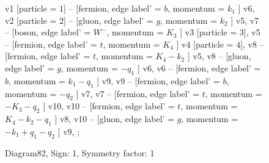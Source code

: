 \documentclass{revtex4}
\begin{document}
\begin{figure}[!htb]
\begin{center}
{    %
v1 [particle = \(1\)] -- [fermion, edge label' = \(b\), momentum = \(k_{1}\) ] v6, 
v2 [particle = \(2\)] -- [gluon, edge label' = \(g\), momentum = \(k_{2}\) ] v5, 
v7 -- [boson, edge label' = \(W^{-}\), momentum = \(K_{3}\) ] v3 [particle = \(3\)], 
v5 -- [fermion, edge label' = \(t\), momentum = \(K_{4}\) ] v4 [particle = \(4\)], 
v8 -- [fermion, edge label' = \(t\), momentum = \(K_{4} - k_{2}\) ] v5, 
v8 -- [gluon, edge label' = \(g\), momentum = \(-q_{1}\) ] v6, 
v6 -- [fermion, edge label' = \(b\), momentum = \(k_{1} - q_{1}\) ] v9, 
v9 -- [fermion, edge label' = \(b\), momentum = \(-q_{2}\) ] v7, 
v7 -- [fermion, edge label' = \(t\), momentum = \(-K_{3} - q_{2}\) ] v10, 
v10 -- [fermion, edge label' = \(t\), momentum = \(K_{4} - k_{2} - q_{1}\) ] v8, 
v10 -- [gluon, edge label' = \(g\), momentum = \(-k_{1} + q_{1} - q_{2}\) ] v9, 
};
\end{center}
\caption{Diagram82, Sign: 1, Symmetry factor: 1}
\end{figure}
\newpage
\end{document}
